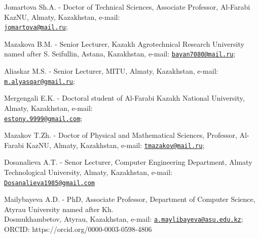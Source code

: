 \begin{authorinfo}
Jomartova Sh.A. - Doctor of Technical Sciences, Associate Professor,
Al-Farabi KazNU, Almaty, Kazakhstan, e-mail:\\
\href{mailto:jomartova@mail.ru}{\nolinkurl{jomartova@mail.ru}};

Mazakova B.M. - Senior Lecturer, Kazakh Agrotechnical Research
University named after S. Seifullin, Astana, Kazakhstan, e-mail:
\href{mailto:bayan7080@mail.ru}{\nolinkurl{bayan7080@mail.ru}};

Aliaskar M.S. - Senior Lecturer, MITU, Almaty, Kazakhstan, e-mail:
\href{mailto:m.alyasqar@gmail.ru}{\nolinkurl{m.alyasqar@gmail.ru}};

Mergengali E.K. - Doctoral student of Al-Farabi Kazakh National
University, Almaty, Kazakhstan, e-mail:\\
\href{mailto:estony.9999@gmail.com}{\nolinkurl{estony.9999@gmail.com}};

Mazakov T.Zh. - Doctor of Physical and Mathematical Sciences, Professor,
Al-Farabi KazNU, Almaty, Kazakhstan, e-mail:
\href{mailto:tmazakov@mail.ru}{\nolinkurl{tmazakov@mail.ru}};

Dosanalieva A.T. - Senor Lecturer, Computer Engineering Department,
Almaty Technological University, Almaty, Kazakhstan, e-mail:
\href{mailto:Dosanalieva1985@gmail.com}{\nolinkurl{Dosanalieva1985@gmail.com}}

Mailybayeva A.D. - PhD, Associate Professor, Department of Computer
Science, Atyrau University named after Kh. \\Dosmukhambetov, Atyrau,
Kazakhstan, e-mail:
\href{mailto:a.maylibayeva@asu.edu.kz}{\nolinkurl{a.maylibayeva@asu.edu.kz}};
ORCID: https://orcid.org/0000-0003-0598-4806
\end{authorinfo}
